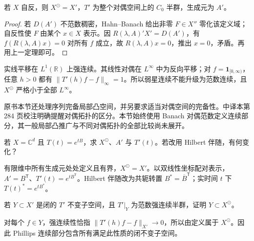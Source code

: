 \begin{corollary}[自反空间上的对偶半群]
若 $X$ 自反，则 $X^\odot=X'$，$T'$ 为整个对偶空间上的 $C_0$ 半群，生成元为 $A'$。
\end{corollary}
\begin{proof}
若 $D(A')$ 不范数稠密，Hahn--Banach 给出非零 $F\in X''$ 零化该定义域；自反性使 $F$ 由某个 $x\in X$ 表示。因 $R(\lambda,A)'X'=D(A')$，有 $f(R(\lambda,A)x)=0$ 对所有 $f$ 成立，故 $R(\lambda,A)x=0$，推出 $x=0$，矛盾。再用上一定理即可。
\end{proof}

\begin{example}[整个对偶上的强连续性会失败]
实线平移在 $L^1(\mathbb R)$ 上强连续。其线性对偶在 $L^\infty$ 中为反向平移；对 $f=\mathbf1_{[0,\infty)}$，任意 $h>0$ 都有 $\|T'(h)f-f\|_\infty=1$。所以弱星连续不能升级为范数连续，且 $X^\odot$ 严格小于全部 $L^\infty$。
\end{example}

原书本节还处理序列完备局部凸空间，并另要求适当对偶空间的完备性。中译本第 284 页校注明确提醒对偶拓扑的区分。本节始终使用 Banach 对偶范数定义连续部分，其一般局部凸推广与不同对偶拓扑的全部比较尚未展开。

\begin{exercise}[有限维对偶]\label{ex:y9-dual-finite}
若 $X=\mathbb C^d$ 且 $T(t)=e^{tB}$，求 $X^\odot$、$A'$ 与 $T'(t)$。若改用 Hilbert 伴随，有何变化？
\end{exercise}
\begin{solution}
有限维中所有生成元处处定义且有界，$X^\odot=X'$。以双线性坐标配对表示，$A'=B^{\mathsf T}$、$T'(t)=e^{tB^{\mathsf T}}$。Hilbert 伴随改为共轭转置 $B^*=\overline B^{\mathsf T}$；实时间 $t$ 下 $T(t)^*=e^{tB^*}$。
\end{solution}

\begin{exercise}[连续部分的最大性]\label{ex:y9-sun-maximal}
若 $Y\subset X'$ 是闭的 $T'$ 不变子空间，且 $T'|_Y$ 为范数强连续半群，证明 $Y\subset X^\odot$。
\end{exercise}
\begin{solution}
对每个 $f\in Y$，强连续性恰指 $\|T'(h)f-f\|_{X'}\to0$，所以由定义属于 $X^\odot$。因此 Phillips 连续部分包含所有满足此性质的闭不变子空间。
\end{solution}
